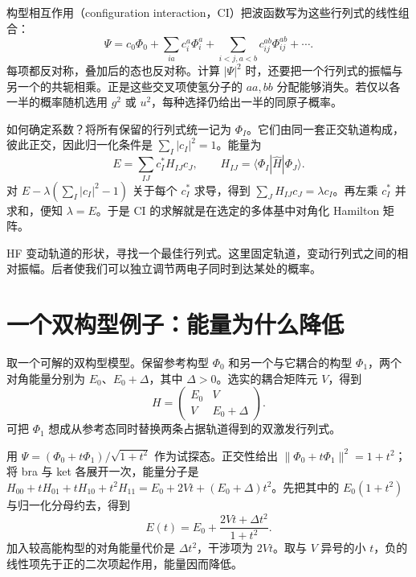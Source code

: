 构型相互作用（configuration interaction，CI）把波函数写为这些行列式的线性组合：
\begin{equation}\label{ci:expansion}
\Psi=c_0\Phi_0+\sum_{ia}c_i^a\Phi_i^a+
\sum_{i<j,a<b}c_{ij}^{ab}\Phi_{ij}^{ab}+\cdots.
\end{equation}
每项都反对称，叠加后的态也反对称。计算 $|\Psi|^2$ 时，还要把一个行列式的振幅与另一个的共轭相乘。正是这些交叉项使氢分子的 $aa,bb$ 分配能够消失。若仅以各一半的概率随机选用 $g^2$ 或 $u^2$，每种选择仍给出一半的同原子概率。

如何确定系数？将所有保留的行列式统一记为 $\Phi_I$。它们由同一套正交轨道构成，彼此正交，因此归一化条件是 $\sum_I|c_I|^2=1$。能量为
\begin{equation}
E=\sum_{IJ}c_I^*H_{IJ}c_J,\qquad
H_{IJ}=\langle\Phi_I|\hat H|\Phi_J\rangle.
\end{equation}
对 $E-\lambda(\sum_I|c_I|^2-1)$ 关于每个 $c_I^*$ 求导，得到 $\sum_JH_{IJ}c_J=\lambda c_I$。再左乘 $c_I^*$ 并求和，便知 $\lambda=E$。于是 CI 的求解就是在选定的多体基中对角化 Hamilton 矩阵。

HF 变动轨道的形状，寻找一个最佳行列式。这里固定轨道，变动行列式之间的相对振幅。后者使我们可以独立调节两电子同时到达某处的概率。

\section{一个双构型例子：能量为什么降低}
取一个可解的双构型模型。保留参考构型 $\Phi_0$ 和另一个与它耦合的构型 $\Phi_1$，两个对角能量分别为 $E_0$、$E_0+\Delta$，其中 $\Delta>0$。选实的耦合矩阵元 $V$，得到
\begin{equation}\label{ci:two}
H=\begin{pmatrix}E_0&V\\V&E_0+\Delta\end{pmatrix}.
\end{equation}
可把 $\Phi_1$ 想成从参考态同时替换两条占据轨道得到的双激发行列式。

用 $\Psi=(\Phi_0+t\Phi_1)/\sqrt{1+t^2}$ 作为试探态。正交性给出 $\|\Phi_0+t\Phi_1\|^2=1+t^2$；将 bra 与 ket 各展开一次，能量分子是 $H_{00}+tH_{01}+tH_{10}+t^2H_{11}=E_0+2Vt+(E_0+\Delta)t^2$。先把其中的 $E_0(1+t^2)$ 与归一化分母约去，得到
\begin{equation}
E(t)=E_0+\frac{2Vt+\Delta t^2}{1+t^2}.
\end{equation}
加入较高能构型的对角能量代价是 $\Delta t^2$，干涉项为 $2Vt$。取与 $V$ 异号的小 $t$，负的线性项先于正的二次项起作用，能量因而降低。

